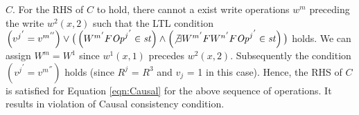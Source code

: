 \documentclass{sig-alternate-05-2015}
\begin{document}
  $C$. For the RHS of $C$ to hold, there cannot a exist write operations $w^m$ preceding the write $w^2(x,2)$ such that the
  LTL condition $\left( {v^j}^{'} = {v^m}^{''} \right) \vee
 \big( \left( {W^m}^{'} F {\mathit{Op}^j}^{'} \in \mathit{st} \right) \wedge
\left( \not\exists {W^m}^{'} F {W^n}^{'} F {\mathit{Op}^j}^{'} \in \mathit{st} \right) \big)$
 holds.
 We can assign $W^m = W^1$ since $w^1(x,1)$ precedes $w^2(x,2)$. Subsequently the condition \\ $\left( {v^j}^{'} = {v^m}^{''} \right)$
 holds (since $R^j$ = $R^3$ and $v_j$ = 1 in this case). Hence, the RHS of $C$ is satisfied for Equation \ref{eqn:Causal} for the above sequence of operations.
 It results in
   violation of Causal consistency condition.
\end{document}
